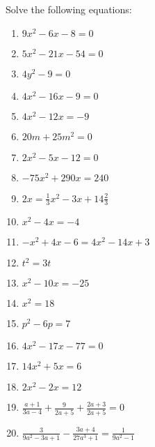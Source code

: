 \begin{exercises}{ }
{
Solve the following equations:
\begin{multicols}{2}
\begin{enumerate}[itemsep=2pt, label=\textbf{\arabic*}. ] 
\item  $9x^{2}-6x-8=0$%
\item  $5x^{2}-21x-54=0$%
\item  $4y^{2}-9=0$%
\item  $4x^{2}-16x-9=0$%
\item  $4x^{2}-12x=-9$%
\item  $20m+25{m}^{2}=0$
\item  $2{x}^{2}-5x-12=0$  
\item  $-75{x}^{2}+290x=240$
\item  $2x=\frac{1}{3}{x}^{2}-3x+14\frac{2}{3}$
\item  ${x}^{2}-4x=-4$      
\item  $-{x}^{2}+4x-6=4{x}^{2}-14x+3$       
\item  ${t}^{2}=3t$  
\item  ${x}^{2}-10x=-25$      
\item  ${x}^{2}=18$
\item  ${p}^{2}-6p=7$
\item  $4{x}^{2}-17x-77=0$
\item  $14{x}^{2}+5x=6$
\item  $2{x}^{2}-2x=12$
\item  $\frac{a+1}{3a-4}+\frac{9}{2a+5}+\frac{2a+3}{2a+5}=0$
\item  $\frac{3}{9a^2-3a+1}-\frac{3a+4}{27a^3+1}=\frac{1}{9a^2-1}$                
\end{enumerate}
\end{multicols}

}
\end{exercises}


